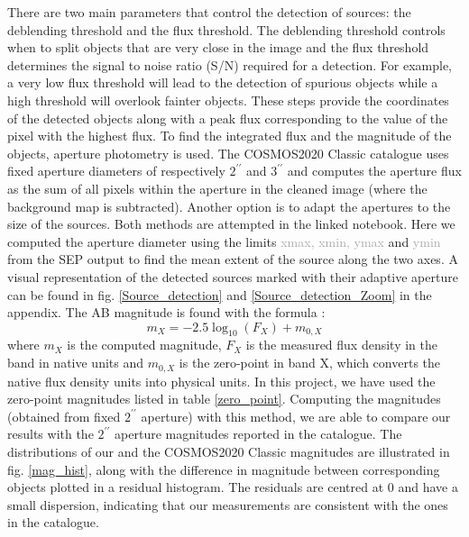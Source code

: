There are two main parameters that control the detection of sources: the deblending threshold and the flux threshold. The deblending threshold controls when to split objects that are very close in the image and the flux threshold determines the signal to noise ratio (S/N) required for a detection. For example, a very low flux threshold will lead to the detection of spurious objects while a high threshold will overlook fainter objects. These steps provide the coordinates of the detected objects along with a peak flux corresponding  to the value of the pixel with the highest flux. To find the integrated flux and the magnitude of the objects, aperture photometry is used. The COSMOS2020 Classic catalogue uses fixed aperture diameters of respectively $2^{\prime\prime}$ and $3^{\prime\prime}$ and computes the aperture flux as the sum of all pixels within the aperture in the cleaned image (where the background map is subtracted). Another option is to adapt the apertures to the size of the sources. Both methods are attempted in the linked notebook. Here we computed the aperture diameter using the limits \textcolor{darkgray}{xmax, xmin, ymax} and \textcolor{darkgray}{ymin} from the SEP output to find the mean extent of the source along the two axes. A visual representation of the detected sources marked with their adaptive aperture can be found in fig. \ref{Source_detection} and \ref{Source_detection_Zoom} in the appendix. The AB magnitude is found with the formula \cite{mo_van_den_bosch_white_2010_MBW_BOOK}:
\begin{equation}
    m_X = -2.5\log_{10}(F_X) + m_{0,X}
\end{equation}
where $m_X$ is the computed magnitude, $F_X$ is the measured flux density in the band in native units and $m_{0,X}$ is the zero-point in band X, which converts the native flux density units into physical units. In this project, we have used the zero-point magnitudes listed in table \ref{zero_point}. Computing the magnitudes (obtained from fixed $2^{\prime\prime}$ aperture) with this method, we are able to compare our results with the $2^{\prime\prime}$ aperture magnitudes reported in the catalogue. The distributions of our and the COSMOS2020 Classic magnitudes are illustrated in fig. \ref{mag_hist}, along with the difference in magnitude between corresponding objects plotted in a residual histogram. The residuals are centred at 0 and have a small dispersion, indicating that our measurements are consistent with the ones in the catalogue.
